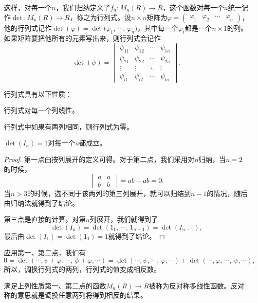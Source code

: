 这样，对每一个$n$，我们归纳定义了$f_n:M_n(R)\to R$，这个函数对每一个$n$统一记作$\det:M_n(R)\to R$，称之为行列式。设$n\times n$矩阵为$\varphi=\begin{pmatrix}\varphi_{1} & \varphi_{2} & \cdots & \varphi_{n}\end{pmatrix}$，他的行列式记作$\det(\varphi)=\det(\varphi_1$, $\cdots$, $\varphi_n)$，其中每一个$\varphi_i$都是一个$n\times 1$的列。如果矩阵要把他所有的元素写出来，则行列式会记作
\[
\det(\psi)=\begin{vmatrix}
	\psi_{11} & \psi_{12} & \cdots & \psi_{1n}\\
	\psi_{21} & \psi_{22} & \cdots & \psi_{2n}\\
	\vdots & \vdots & \ddots & \vdots \\
	\psi_{l1} & \psi_{l2} & \cdots & \psi_{ln}
\end{vmatrix}.
\]

\begin{pro}
行列式具有以下性质：

\begin{compactenum}[(1)]
\item 行列式对每一个列线性。
\item 行列式中如果有两列相同，则行列式为零。
\item $\det(I_n)=1$对每一个$n$都成立。
\end{compactenum}
\end{pro}

\begin{proof}
	第一点由按列展开的定义可得。对于第二点，我们采用对$n$归纳，当$n=2$的时候，
	\[
		\begin{vmatrix}a&a\\b&b\end{vmatrix}=ab-ab=0.
	\]
	当$n>3$的时候，选不同于该两列的第三列展开，就可以归结到$n-1$的情况，随后由归纳法就得到了结论。

	第三点是直接的计算，对第$n$列展开，我们就得到了
	\[
		\det(I_n)=\det(1_1,\,\cdots\!,\,1_{n-1})=\det(I_{n-1}),
	\]
	最后由$\det(I_1)=\det(1_1)=1$就得到了结论。
\end{proof}

应用第一、第二点，我们有
\[
	0=\det(\cdots\!,\psi+\varphi,\,\cdots\!,\,\psi+\varphi,\cdots)=\det(\cdots\!,\psi,\,\cdots\!,\,\varphi,\cdots)+\det(\cdots\!,\varphi,\,\cdots\!,\,\psi,\cdots),
\]
所以，调换行列式的两列，行列式的值变成相反数。

满足上列性质第一、第二点的函数$M_n(R)\to R$被称为反对称多线性函数。反对称的意思就是调换任意两列将得到相反的结果。

